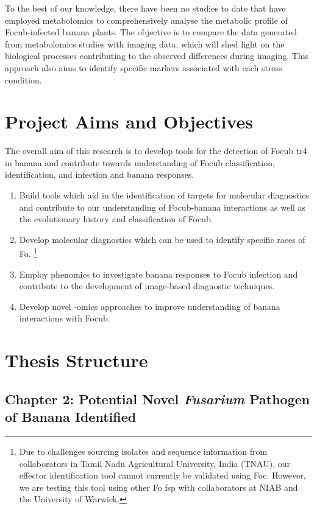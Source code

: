 To the best of our knowledge, there have been no studies to date that have employed metabolomics to comprehensively analyse the metabolic profile of \ac{Focub}-infected banana plants. The objective is to compare the data generated from metabolomics studies with imaging data, which will shed light on the biological processes contributing to the observed differences during imaging. This approach also aims to identify specific markers associated with each stress condition. 

\newpage
\section{Project Aims and Objectives}

The overall aim of this research is to develop tools for the detection of \acl{Focub} \ac{tr4} in banana and contribute towards understanding of \acl{Focub} classification, identification, and infection and banana responses. 

\begin{enumerate}
    \item Build tools which aid in the identification of targets for molecular diagnostics and contribute to our understanding of \ac{Focub}-banana interactions as well as the evolutionary history and classification of \ac{Focub}. 
    \item Develop molecular diagnostics which can be used to identify specific races of \acl{Fo}. \footnote{Due to challenges sourcing isolates and sequence information from collaborators in Tamil Nadu Agricultural University, India (TNAU), our effector identification tool cannot currently be validated using Foc. However, we are testing this tool using other \acl{Fo} \ac{fsp} with collaborators at NIAB and the University of Warwick.}
    \item Employ phenomics to investigate banana responses to \ac{Focub} infection and contribute to the development of image-based diagnostic techniques.  
    \item Develop novel -omics approaches to improve understanding of banana interactions with \ac{Focub}.  
\end{enumerate}

\newpage
\section{Thesis Structure}

\subsection{Chapter 2: Potential Novel \textit{Fusarium} Pathogen of Banana Identified} 

